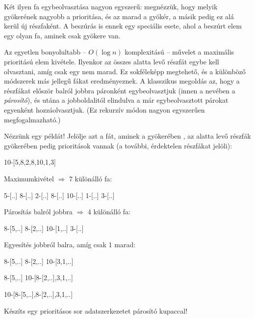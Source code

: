 Két ilyen fa egybeolvasztása nagyon egyszerű:
megnézzük, hogy melyik gyökerének nagyobb a
prioritása, és az marad a gyökér, a másik pedig ez
alá kerül új részfaként. A beszúrás is ennek egy
speciális esete, ahol a beszúrt elem egy olyan fa,
aminek csak gyökere van.

Az egyetlen bonyolultabb -- $O(\log n)$ komplexitású
-- művelet a maximális prioritású elem
kivétele. Ilyenkor az összes alatta levő részfát
egybe kell olvasztani, amíg csak egy nem marad. Ez
sokféleképp megtehető, és a különböző módszerek más
jellegű fákat eredményeznek. A klasszikus megoldás
az, hogy a részfákat először balról jobbra páronként
egybeolvasztjuk (innen a nevében a \emph{párosító}),
és utána a jobboldalitól elindulva a már
egybeolvasztott párokat egyenként
hozzáolvasztjuk. (Ez rekurzív módon nagyon
egyszerűen megfogalmazható.)

Nézzünk egy példát! Jelölje  azt
a fát, aminek a gyökerében , az alatta levő
részfák gyökerében pedig  prioritások vannak
(a további, érdektelen részfákat  jelöli):
\begin{query}
10-[5,8,2,8,10,1,3]
\end{query}
Maximumkivétel $\Rightarrow$ 7 különálló fa:
\begin{query}
5-[..] 8-[..] 2-[..] 8-[..] 10-[..] 1-[..] 3-[..]
\end{query}
Párosítás balról jobbra $\Rightarrow$ 4 különálló
fa:
\begin{query}
8-[5,..] 8-[2,..] 10-[1,..] 3-[..]
\end{query}
Egyesítés jobbról balra, amíg csak 1 marad:
\begin{query}
8-[5,..] 8-[2,..] 10-[3,1,..]

8-[5,..] 10-[8-[2,..],3,1,..]

10-[8-[5,..],8-[2,..],3,1,..]
\end{query}
\begin{problem}
Készíts egy prioritásos sor adatszerkezetet párosító
kupaccal!
\end{problem}
